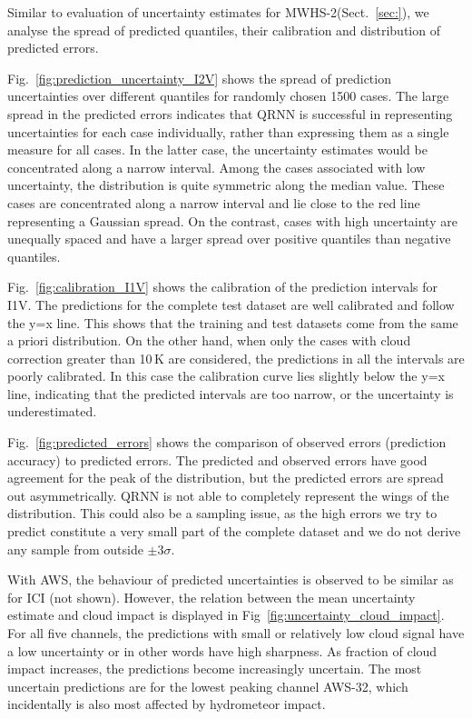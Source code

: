 \documentclass[amt, manuscript]{copernicus}
\begin{document}
Similar to evaluation of uncertainty estimates for MWHS-2(Sect.~\ref{sec:}), we analyse the spread of predicted quantiles, their calibration and distribution of predicted errors. 

Fig.~\ref{fig:prediction_uncertainty_I2V} shows the spread of prediction uncertainties over different quantiles for randomly chosen 1500 cases. The large spread in the predicted errors indicates that QRNN is successful in representing uncertainties for each case individually, rather than expressing them as a single measure for all cases. In the latter case, the uncertainty estimates would be concentrated along a narrow interval. Among the cases associated with low uncertainty, the distribution is quite symmetric along the median value. These cases are concentrated along a narrow interval and lie close to the red line representing a Gaussian spread. On the contrast, cases with high uncertainty are unequally spaced and have a larger spread over positive quantiles than negative quantiles. 

Fig.~\ref{fig:calibration_I1V} shows the calibration of the prediction intervals for I1V. The predictions for the complete test dataset are well calibrated and follow the y=x line. This shows that the training and test datasets come from the same a priori distribution. On the other hand, when only the cases with  cloud correction greater than 10\,K are considered, the predictions in all the intervals are poorly calibrated. In this case the calibration curve lies slightly below the y=x line, indicating that the predicted intervals are too narrow, or the uncertainty is underestimated. 

Fig.~\ref{fig:predicted_errors} shows the comparison of observed errors (prediction accuracy) to predicted errors. The predicted and observed errors have good agreement for the peak of the distribution, but the predicted errors are spread out asymmetrically. QRNN is not able to completely represent the wings of the distribution. This could also be a sampling issue, as the high errors we try to predict constitute a very small part of the complete dataset and we do not derive any sample from outside $\pm3\sigma$.   

With AWS, the behaviour of predicted uncertainties is observed to be similar as for ICI (not shown). However, the relation between the mean uncertainty estimate and cloud impact is displayed in Fig~\ref{fig:uncertainty_cloud_impact}. For all five channels, the predictions with small or relatively low cloud signal have a low uncertainty or in other words have high sharpness. As fraction of cloud impact increases, the predictions become increasingly uncertain. The most uncertain predictions are for the lowest peaking channel AWS-32, which incidentally is also most affected by  hydrometeor impact.  
\end{document}

